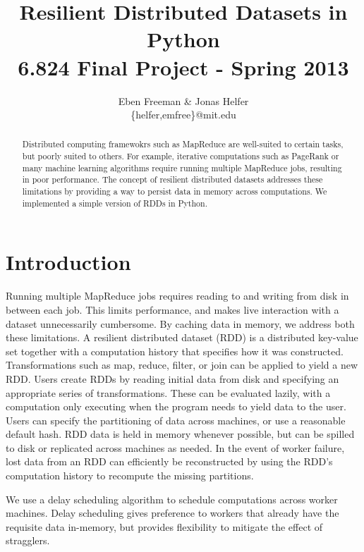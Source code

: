 \documentclass[10pt]{article}
\begin{document}
\title{Resilient Distributed Datasets in Python \\ \small{6.824 Final Project -
Spring 2013}} \author{Eben Freeman \& Jonas Helfer\\
  \small{\{helfer,emfree\}@mit.edu} } \maketitle

\begin{abstract} Distributed computing framewokrs such as MapReduce
  are well-suited to certain tasks, but poorly suited to others. For example,
  iterative computations such as PageRank or many machine learning algorithms
  require running multiple MapReduce jobs, resulting in poor performance. The
  concept of resilient distributed datasets addresses these limitations by
  providing a way to persist data in memory across computations. We implemented
  a simple version of RDDs in Python.

\end{abstract} \section*{Introduction} Running multiple MapReduce jobs requires
reading to and writing from disk in between each job. This limits performance,
and makes live interaction with a dataset unnecessarily cumbersome. By caching data
in memory, we address both these limitations.
A resilient distributed dataset (RDD) is a distributed key-value set together
with a computation history that specifies how it was constructed.\cite{rdd} Transformations
such as map, reduce, filter, or join can be applied to yield a new RDD.
Users create RDDs by reading initial data from disk and specifying an
appropriate series of transformations. These can be evaluated lazily, with a
computation only executing when the program needs to yield data to the user.
Users can specify the partitioning of data across machines, or use a reasonable
default hash. RDD data is held in memory whenever possible, but can
be spilled to disk or replicated across machines as needed. In the event of
worker failure, lost data from an RDD can efficiently be reconstructed by using the RDD's
computation history to recompute the missing partitions.

We use a delay scheduling algorithm to schedule computations across worker
machines.\cite{delay} Delay scheduling gives preference to workers that already
have the requisite data in-memory, but provides flexibility to mitigate the
effect of stragglers.
\end{document}
